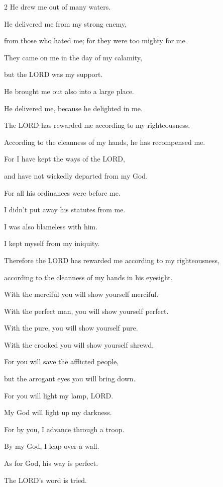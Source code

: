 \begin{multicols}{2}
	He drew me out of many waters.
	
	
	\myverse{}He delivered me from my strong enemy,
	
	from those who hated me; for they were too mighty for me.
	
	
	\myverse{}They came on me in the day of my calamity,
	
	but the LORD was my support.
	
	
	\myverse{}He brought me out also into a large place.
	
	He delivered me, because he delighted in me.
	
	
	\myverse{}The LORD has rewarded me according to my righteousness.
	
	According to the cleanness of my hands, he has recompensed me.
	
	
	\myverse{}For I have kept the ways of the LORD,
	
	and have not wickedly departed from my God.
	
	
	\myverse{}For all his ordinances were before me.
	
	I didn’t put away his statutes from me.
	
	
	\myverse{}I was also blameless with him.
	
	I kept myself from my iniquity.
	
	
	\myverse{}Therefore the LORD has rewarded me according to my righteousness,
	
	according to the cleanness of my hands in his eyesight.
	
	
	\myverse{}With the merciful you will show yourself merciful.
	
	With the perfect man, you will show yourself perfect.
	
	
	\myverse{}With the pure, you will show yourself pure.
	
	With the crooked you will show yourself shrewd.
	
	
	\myverse{}For you will save the afflicted people,
	
	but the arrogant eyes you will bring down.
	
	
	\myverse{}For you will light my lamp, LORD.
	
	My God will light up my darkness.
	
	
	\myverse{}For by you, I advance through a troop.
	
	By my God, I leap over a wall.
	
	
	\myverse{}As for God, his way is perfect.
	
	The LORD’s word is tried.
	

\end{multicols}
